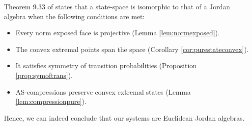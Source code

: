 \documentclass[a4paper,onecolumn,10pt,accepted=2019-05-03, issue=1, volume=1, shorttitle=papers/compositionality-1-1]{compositionalityarticle}
\newcounter{counter}
\numberwithin{counter}{section}
\newtheorem{proposition}[counter]{Proposition}
\newcommand{\asrt}{\text{asrt}}
\newcommand{\im}[1]{\text{im}(#1)}
\begin{document}
Theorem 9.33 of \cite{alfsen2012geometry} states that a state-space is isomorphic to that of a Jordan algebra when the following conditions are met:
\begin{itemize}
    \item Every norm exposed face is projective (Lemma \ref{lem:normexposed}).
    \item The convex extremal points span the space (Corollary \ref{cor:purestateconvex}).
    \item It satisfies symmetry of transition probabilities (Proposition \ref{prop:symoftrans}).
    \item AS-compressions preserve convex extremal states (Lemma \ref{lem:compressionpure}).
\end{itemize}

Hence, we can indeed conclude that our systems are Euclidean Jordan algebras.




\end{document}
